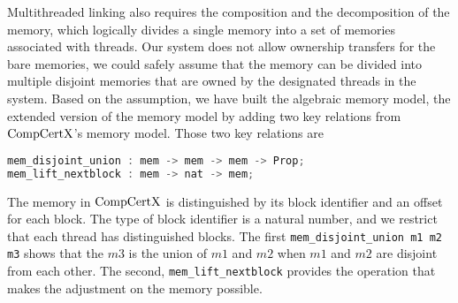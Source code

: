 Multithreaded linking also requires the composition and the decomposition of the memory,
which logically divides a single memory into a set of memories associated with threads.
Our system does not allow ownership transfers for the bare memories, 
we could safely assume that the memory can be divided into multiple disjoint memories that are owned by the designated threads in the system. 
Based on the assumption, 
we have built the algebraic memory model, the extended version of the memory model by adding two key relations from $\mathrm{CompCertX}$'s memory model.
Those two key relations are 
\begin{lstlisting}[language=C]
mem_disjoint_union : mem -> mem -> mem -> Prop;
mem_lift_nextblock : mem -> nat -> mem;
\end{lstlisting}
The memory in $\mathrm{CompCertX}$ is distinguished by its block identifier and an offset for each block. 
The type of block identifier is a natural number,
and we restrict that each thread has distinguished blocks.  
The first \lstinline$mem_disjoint_union m1 m2 m3$  shows that 
the $m3$ is the union of $m1$ and $m2$ when $m1$ and $m2$ 
are disjoint from each other. 
The second, \lstinline$mem_lift_nextblock$ 
provides the operation that makes the adjustment on the memory possible. 




